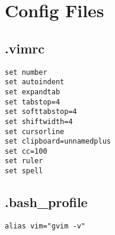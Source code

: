 \documentclass[letterpaper]{article}
\begin{document}
\newpage
\section{Config Files}
\subsection{.vimrc}
\begin{lstlisting}
set number
set autoindent
set expandtab
set tabstop=4
set softtabstop=4
set shiftwidth=4
set cursorline
set clipboard=unnamedplus
set cc=100
set ruler
set spell
\end{lstlisting}

\subsection{.bash\_profile}
\begin{lstlisting}
alias vim="gvim -v"
\end{lstlisting}
\end{document}
